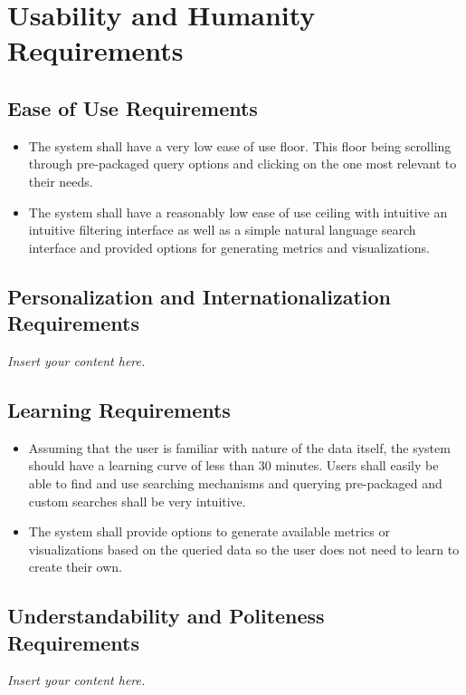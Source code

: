 \documentclass[12pt]{article}
\newcommand{\lips}{\textit{Insert your content here.}}
\begin{document}
\section{Usability and Humanity Requirements}



\subsection{Ease of Use Requirements}

\begin{itemize}
    \item The system shall have a very low ease of use floor. This floor being scrolling through
    pre-packaged query options and clicking on the one most relevant to their needs.
    \item The system shall have a reasonably low ease of use ceiling with intuitive an intuitive filtering interface
    as well as a simple natural language search interface and provided options for generating metrics and visualizations.
\end{itemize}

\subsection{Personalization and Internationalization Requirements}
\lips



\subsection{Learning Requirements}

\begin{itemize}
    \item Assuming that the user is familiar with nature of the data itself, the system should
    have a learning curve of less than 30 minutes. Users shall easily be able to find and use searching
    mechanisms and querying pre-packaged and custom searches shall be very intuitive.
    \item The system shall provide options to generate available metrics or visualizations based on the queried
    data so the user does not need to learn to create their own.
\end{itemize}

\subsection{Understandability and Politeness Requirements}
\lips
\end{document}
